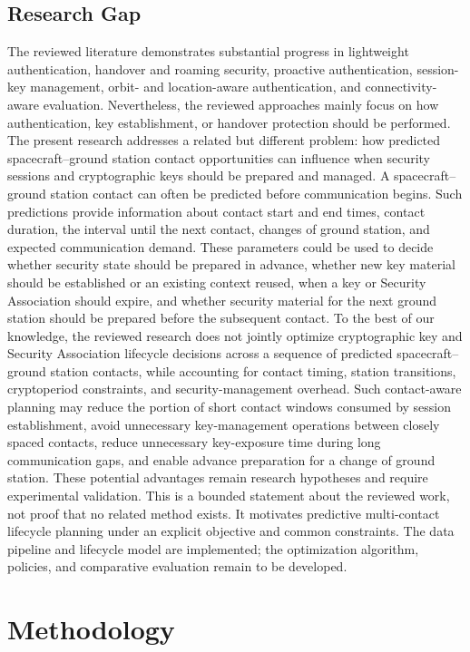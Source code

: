 \documentclass[conference]{IEEEtran}
\begin{document}
\subsection{Research Gap}
The reviewed literature demonstrates substantial progress in lightweight authentication, handover and roaming security, proactive authentication, session-key management, orbit- and location-aware authentication, and connectivity-aware evaluation. Nevertheless, the reviewed approaches mainly focus on how authentication, key establishment, or handover protection should be performed.
The present research addresses a related but different problem: how predicted spacecraft--ground station contact opportunities can influence when security sessions and cryptographic keys should be prepared and managed.
A spacecraft--ground station contact can often be predicted before communication begins. Such predictions provide information about contact start and end times, contact duration, the interval until the next contact, changes of ground station, and expected communication demand. These parameters could be used to decide whether security state should be prepared in advance, whether new key material should be established or an existing context reused, when a key or Security Association should expire, and whether security material for the next ground station should be prepared before the subsequent contact. 
To the best of our knowledge, the reviewed research does not jointly optimize cryptographic key and Security Association lifecycle decisions across a sequence of predicted spacecraft--ground station contacts, while accounting for contact timing, station transitions, cryptoperiod constraints, and security-management overhead.
Such contact-aware planning may reduce the portion of short contact windows consumed by session establishment, avoid unnecessary key-management operations between closely spaced contacts, reduce unnecessary key-exposure time during long communication gaps, and enable advance preparation for a change of ground station. These potential advantages remain research hypotheses and require experimental validation. 
This is a bounded statement about the reviewed work, not proof that no related method exists. It motivates predictive multi-contact lifecycle planning under an explicit objective and common constraints. The data pipeline and lifecycle model are implemented; the optimization algorithm, policies, and comparative evaluation remain to be developed.


\section{Methodology}
\end{document}
